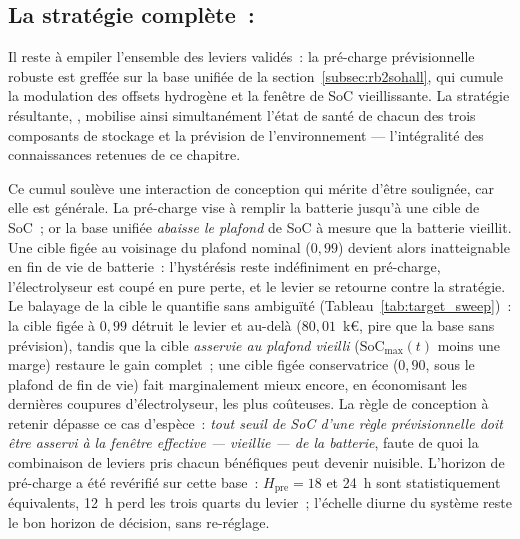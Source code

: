 \subsection{La stratégie complète~: \RBult}
\label{subsec:ultime}

Il reste à empiler l'ensemble des leviers validés~: la pré-charge prévisionnelle robuste est greffée sur la base unifiée \RBsohA{} de la section~\ref{subsec:rb2sohall}, qui cumule la modulation des offsets hydrogène et la fenêtre de SoC vieillissante. La stratégie résultante, \RBult, mobilise ainsi simultanément l'état de santé de chacun des trois composants de stockage et la prévision de l'environnement — l'intégralité des connaissances retenues de ce chapitre.

Ce cumul soulève une interaction de conception qui mérite d'être soulignée, car elle est générale. La pré-charge vise à remplir la batterie jusqu'à une cible de SoC~; or la base unifiée \emph{abaisse le plafond} de SoC à mesure que la batterie vieillit. Une cible figée au voisinage du plafond nominal ($0{,}99$) devient alors inatteignable en fin de vie de batterie~: l'hystérésis reste indéfiniment en pré-charge, l'électrolyseur est coupé en pure perte, et le levier se retourne contre la stratégie. Le balayage de la cible le quantifie sans ambiguïté (Tableau~\ref{tab:target_sweep})~: la cible figée à $0{,}99$ détruit le levier et au-delà ($80{,}01$~k€, pire que la base sans prévision), tandis que la cible \emph{asservie au plafond vieilli} ($\mathrm{SoC}_{\max}(t)$ moins une marge) restaure le gain complet~; une cible figée conservatrice ($0{,}90$, sous le plafond de fin de vie) fait marginalement mieux encore, en économisant les dernières coupures d'électrolyseur, les plus coûteuses. La règle de conception à retenir dépasse ce cas d'espèce~: \emph{tout seuil de SoC d'une règle prévisionnelle doit être asservi à la fenêtre effective — vieillie — de la batterie}, faute de quoi la combinaison de leviers pris chacun bénéfiques peut devenir nuisible. L'horizon de pré-charge a été revérifié sur cette base~: $H_{\text{pre}} = 18$ et \SI{24}{\hour} sont statistiquement équivalents, \SI{12}{\hour} perd les trois quarts du levier~; l'échelle diurne du système reste le bon horizon de décision, sans re-réglage.

